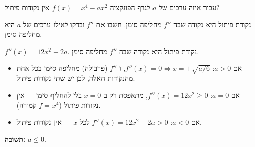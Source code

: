 
\begin{question}
עבור איזה ערכים של $a$ לגרף הפונקציה $f(x)=x^4-ax^2$ אין נקודות פיתול?
\end{question}

\begin{hint}
נקודת פיתול היא נקודה שבה $f''$ מחליפה סימן. חשבו את $f''$ ובדקו לאילו ערכים של $a$ היא מחליפה סימן.
\end{hint}

\begin{solution}
$f''(x)=12x^2-2a$. נקודת פיתול היא נקודה שבה $f''$ מחליפה סימן.
\begin{itemize}
  \item אם $a>0$: $f''(x)=0\iff x=\pm\sqrt{a/6}$, ו-$f''$ (פרבולה) מחליפה סימן בכל אחת מהנקודות האלה, לכן יש שתי נקודות פיתול.
  \item אם $a=0$: $f''(x)=12x^2\ge0$, מתאפסת רק ב-$x=0$ בלי להחליף סימן — אין נקודות פיתול ($f=x^4$ קמורה).
  \item אם $a<0$: $f''(x)=12x^2-2a>0$ לכל $x$ — אין נקודות פיתול.
\end{itemize}
\textbf{תשובה:} $a\le0$.
\end{solution}
